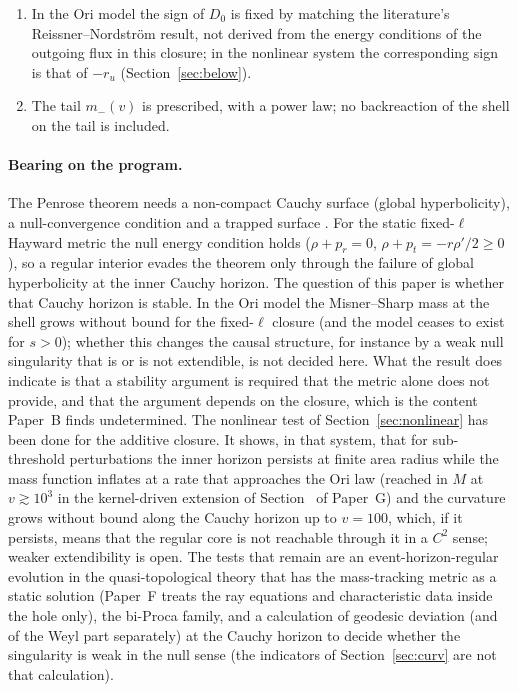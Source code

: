 \documentclass[11pt]{article}
\begin{document}
\begin{enumerate}
\item In the Ori model the sign of $D_0$ is fixed by matching the literature's Reissner--Nordstr\"om result, not derived from the energy conditions of the outgoing flux in this closure; in the nonlinear system the corresponding sign is that of $-r_u$ (Section~\ref{sec:below}).
\item The tail $m_-(v)$ is prescribed, with a power law; no backreaction of the shell on the tail is included.
\end{enumerate}

\paragraph{Bearing on the program.} The Penrose theorem needs a non-compact Cauchy surface (global hyperbolicity), a null-convergence condition and a trapped surface \citep{Penrose1965}. For the static fixed-$\ell$ Hayward metric the null energy condition holds ($\rho+p_r=0$, $\rho+p_t=-r\rho'/2\ge0$), so a regular interior evades the theorem only through the failure of global hyperbolicity at the inner Cauchy horizon. The question of this paper is whether that Cauchy horizon is stable. In the Ori model the Misner--Sharp mass at the shell grows without bound for the fixed-$\ell$ closure (and the model ceases to exist for $s>0$); whether this changes the causal structure, for instance by a weak null singularity that is or is not extendible, is not decided here. What the result does indicate is that a stability argument is required that the metric alone does not provide, and that the argument depends on the closure, which is the content Paper~B finds undetermined. The nonlinear test of Section~\ref{sec:nonlinear} has been done for the additive closure. It shows, in that system, that for sub-threshold perturbations the inner horizon persists at finite area radius while the mass function inflates at a rate that approaches the Ori law (reached in $M$ at $v\gtrsim10^3$ in the kernel-driven extension of Section~\Grayn{} of Paper~G) and the curvature grows without bound along the Cauchy horizon up to $v=100$, which, if it persists, means that the regular core is not reachable through it in a $C^2$ sense; weaker extendibility is open. The tests that remain are an event-horizon-regular evolution in the quasi-topological theory that has the mass-tracking metric as a static solution (Paper~F treats the ray equations and characteristic data inside the hole only), the bi-Proca family, and a calculation of geodesic deviation (and of the Weyl part separately) at the Cauchy horizon to decide whether the singularity is weak in the null sense (the indicators of Section~\ref{sec:curv} are not that calculation).
\end{document}
